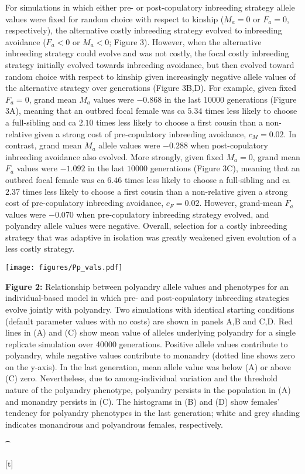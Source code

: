\documentclass[10pt,letterpaper]{article}
\begin{document}
For simulations in which either pre- or post-copulatory inbreeding strategy allele values were fixed for random choice with respect to kinship ($M_{a}=0$ or $F_{a}=0$, respectively), the alternative costly inbreeding strategy evolved to inbreeding avoidance ($F_{a}<0$ or $M_{a}<0$; Figure 3). However, when the alternative inbreeding strategy could evolve and was not costly, the focal costly inbreeding strategy initially evolved towards inbreeding avoidance, but then evolved toward random choice with respect to kinship given increasingly negative allele values of the alternative strategy over generations (Figure 3B,D). For example, given fixed $F_{a}=0$, grand mean $M_{a}$ values were $-0.868$ in the last $10000$ generations (Figure 3A), meaning that an outbred focal female was ca $5.34$ times less likely to choose a full-sibling and ca $2.10$ times less likely to choose a first cousin than a non-relative given a strong cost of pre-copulatory inbreeding avoidance, $c_{M}=0.02$. In contrast, grand mean $M_{a}$ allele values were $-0.288$ when post-copulatory inbreeding avoidance also evolved. More strongly, given fixed $M_{a}=0$, grand mean $F_{a}$ values were $-1.092$ in the last $10000$ generations (Figure 3C), meaning that an outbred focal female was ca $6.46$ times less likely to choose a full-sibling and ca $2.37$ times less likely to choose a first cousin than a non-relative given a strong cost of pre-copulatory inbreeding avoidance, $c_{F}=0.02$. However, grand-mean $F_{a}$ values were $-0.070$ when pre-copulatory inbreeding strategy evolved, and polyandry allele values were negative. Overall, selection for a costly inbreeding strategy that was adaptive in isolation was greatly weakened given evolution of a less costly strategy.

{\color{Gray}
\begin{adjustwidth}{-2.2in}{0in}
{%
   \texttt{[image: figures/Pp\_vals.pdf]}%
}%
{%
   \begin{justify}\vspace{0.25 mm} \textbf{Figure 2:} Relationship between polyandry allele values and phenotypes for an individual-based model in which pre- and post-copulatory inbreeding strategies evolve jointly with polyandry. Two simulations with identical starting conditions (default parameter values with no costs) are shown in panels A,B and C,D. Red lines in (A) and (C) show mean value of alleles underlying polyandry for a single replicate simulation over 40000 generations. Positive allele values contribute to polyandry, while negative values contribute to monandry (dotted line shows zero on the y-axis). In the last generation, mean allele value was below (A) or above (C) zero. Nevertheless, due to among-individual variation and the threshold nature of the polyandry phenotype, polyandry persists in the population in (A) and monandry persists in (C). The histograms in (B) and (D) show females' tendency for polyandry phenotypes in the last generation; white and grey shading indicates monandrous and polyandrous females, respectively.\end{justify}{\t}%
}[t]
\end{adjustwidth}
}
\end{document}
